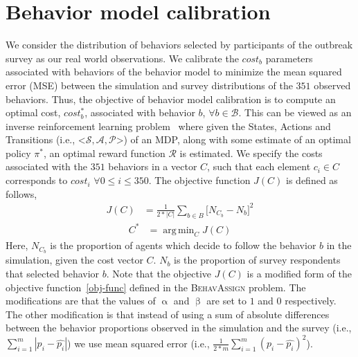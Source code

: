 \documentclass[doublespace]{VTthesis}
\DeclareMathOperator*{\argmin}{arg\,min}
\begin{document}
    \section{Behavior model calibration}
    We consider the distribution of behaviors selected by participants of the outbreak survey as our real world observations. We calibrate the $cost_b$ parameters associated with behaviors of the behavior model to minimize the mean squared error (MSE) between the simulation and survey distributions of the $351$ observed behaviors. Thus, the objective of behavior model calibration is to compute an optimal cost, $cost_b^*$, associated with behavior $b$, $\forall b \in \mathcal{B}$. This can be viewed as an inverse reinforcement learning problem~\cite{ng2000algorithms} where given the States, Actions and Transitions (i.e., \big<$\mathcal{S,A,P}$\big>) of an MDP, along with some estimate of an optimal policy $\pi^*$, an optimal reward function $\mathcal{R}$ is estimated. We specify the costs associated with the $351$ behaviors in a vector $C$, such that each element $c_i \in C$ corresponds to $cost_i$ $\forall 0 \le i \le 350$. The objective function $J(C)$ is defined as follows,
    \begin{align}
        J(C) &= \frac{1}{2 * |C|} \sum_{b \in B}\bigg[ N_{C_b} - N_{b} \bigg]^2
    		\label{eqn:objfn}
    \end{align}
    \begin{align}
    		C^* &= \argmin_C J(C) 
    		\label{eqn:optc}
    \end{align}
    Here, $N_{C_b}$ is the proportion of agents which decide to follow the behavior $b$ in the simulation, given the cost vector $C$. $N_{b}$ is the proportion of survey respondents that selected behavior $b$. Note that the objective $J(C)$ is a modified form of the objective function~\ref{obj-func} defined in the \textsc{BehavAssign} problem. The modifications are that the values of $\upalpha$ and $\upbeta$ are set to $1$ and $0$ respectively. The other modification is that instead of using a sum of absolute differences between the behavior proportions observed in the simulation and the survey (i.e., $\sum_{i=1}^{m}|p_i - \hat{p_i}|$) we use mean squared error (i.e., $ \frac{1}{2 * m}\sum_{i=1}^{m} (p_i - \hat{p_i})^2$). 
    
\end{document}
